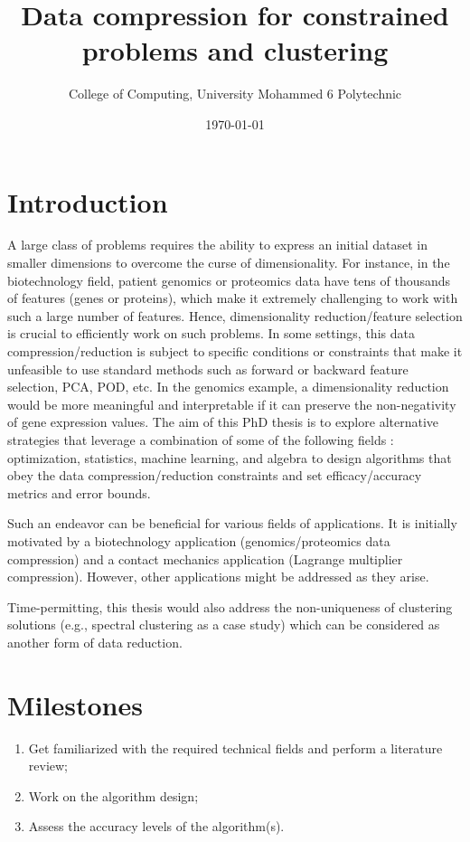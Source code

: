 \documentclass[12pt]{article}
\title{Data compression for constrained problems and clustering}
\author{
	College of Computing, University Mohammed 6 Polytechnic \\
}
\date{\today}
\begin{document}
	
	\maketitle
	
	\section{Introduction}
	A large class of problems requires the ability to express an initial dataset in smaller dimensions to overcome the curse of dimensionality. 
	For instance, in the biotechnology field, patient genomics or proteomics data have tens of thousands of features (genes or proteins), which make it extremely challenging to work with such a large number of features.
	Hence, dimensionality reduction/feature selection is crucial to efficiently work on such problems.
	In some settings, this data compression/reduction is subject to specific conditions or constraints that make it unfeasible to use standard methods such as forward or backward feature selection, PCA, POD, etc.
	In the genomics example, a dimensionality reduction would be more meaningful and interpretable if it can preserve the non-negativity of gene expression values.
	The aim of this PhD thesis is to explore alternative strategies that leverage a combination of some of the following fields : optimization, statistics, machine learning, and algebra to design algorithms that obey the data compression/reduction constraints and set efficacy/accuracy metrics and error bounds.
	
	Such an endeavor can be beneficial for various fields of applications.
	It is initially motivated by a biotechnology application (genomics/proteomics data compression) and a contact mechanics application (Lagrange multiplier compression).
	However, other applications might be addressed as they arise.
	
	Time-permitting, this thesis would also address the non-uniqueness of clustering solutions (e.g., spectral clustering as a case study) which can be considered as another form of data reduction.
	\section{Milestones}
	\begin{enumerate}
		\item Get familiarized with the required technical fields and perform a literature review;
		\item Work on the algorithm design;
		\item Assess the accuracy levels of the algorithm(s).
	\end{enumerate}
	
\end{document}
